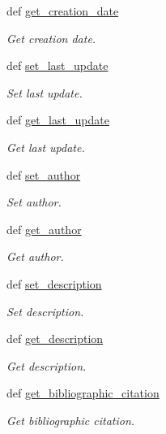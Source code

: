 \begin{DoxyCompactItemize}
def \hyperlink{classlmf_1_1src_1_1core_1_1lexical__resource_1_1_lexical_resource_a7e23a59b49109fa1d1cbe8c72323ec50}{get\+\_\+creation\+\_\+date}
\begin{DoxyCompactList}\small\item\em Get creation date. \end{DoxyCompactList}\item 
def \hyperlink{classlmf_1_1src_1_1core_1_1lexical__resource_1_1_lexical_resource_a786ca883b987fd6283b822bd438547da}{set\+\_\+last\+\_\+update}
\begin{DoxyCompactList}\small\item\em Set last update. \end{DoxyCompactList}\item 
def \hyperlink{classlmf_1_1src_1_1core_1_1lexical__resource_1_1_lexical_resource_ae73d3e66991ffdda64974199ee12434d}{get\+\_\+last\+\_\+update}
\begin{DoxyCompactList}\small\item\em Get last update. \end{DoxyCompactList}\item 
def \hyperlink{classlmf_1_1src_1_1core_1_1lexical__resource_1_1_lexical_resource_af7c40fb3cc957000b20aa39d9c5e6693}{set\+\_\+author}
\begin{DoxyCompactList}\small\item\em Set author. \end{DoxyCompactList}\item 
def \hyperlink{classlmf_1_1src_1_1core_1_1lexical__resource_1_1_lexical_resource_a2e896e7607f9c71e7db166a652137f87}{get\+\_\+author}
\begin{DoxyCompactList}\small\item\em Get author. \end{DoxyCompactList}\item 
def \hyperlink{classlmf_1_1src_1_1core_1_1lexical__resource_1_1_lexical_resource_a416f746c8212930d4d98059dedc7d4c9}{set\+\_\+description}
\begin{DoxyCompactList}\small\item\em Set description. \end{DoxyCompactList}\item 
def \hyperlink{classlmf_1_1src_1_1core_1_1lexical__resource_1_1_lexical_resource_aa86a440b33cbee8982a3130a9de21319}{get\+\_\+description}
\begin{DoxyCompactList}\small\item\em Get description. \end{DoxyCompactList}\item 
def \hyperlink{classlmf_1_1src_1_1core_1_1lexical__resource_1_1_lexical_resource_afd7f3dcab1272bfdca9a573704c04640}{get\+\_\+bibliographic\+\_\+citation}
\begin{DoxyCompactList}\small\item\em Get bibliographic citation. \end{DoxyCompactList}\end{DoxyCompactItemize}
